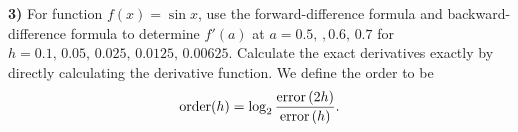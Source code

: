 \documentclass[12pt,a4paper]{article}
\newcommand{\prob}[2]{\textbf{#1)} #2}
\begin{document}
\prob{3}{
    For function $f(x) = \sin{x}$, use the forward-difference formula and backward-difference formula to determine $f'(a)$ at $a = 0.5,\,,0.6,\,0.7$ for $h = 0.1,\,0.05,\,0.025,\,0.0125,\,0.00625$.
    Calculate the exact derivatives exactly by directly calculating the derivative function.
    We define the order to be
    \begin{align*}
        {\rm order}(h) = \log_2{\frac{{\rm error}\left( 2h \right)}{{\rm error}\left( h \right)}}
    .\end{align*}
}

\begin{table}[H]
    \centering
    
\end{table}

\begin{table}[H]
    \centering
    
\end{table}

\begin{table}[H]
    \centering
    
\end{table}
\end{document}
